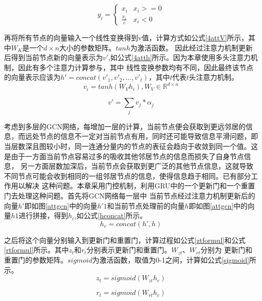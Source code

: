 \begin{equation}\label{4attleakyRelu}
y_i =
\begin{cases}
x_i & \text{$x_i>=0$} \\
\frac{x_i}{c} & \text{$x_i<0$}
\end{cases}
\end{equation}

再将所有节点的向量输入一个线性变换得到v值，计算方式如公式\ref{4attV}所示，其中$W_K$是一个$d\times n$大小的参数矩阵。$tanh$为激活函数。
因此经过注意力机制更新后得到当前节点新的向量表示为$v'$,如公式\ref{4atth}所示。因为本章使用多头注意力机制，因此有多个注意力计算参与，其中
线性变换参数均有不同，因此最终该节点的向量表示应该为$h'= concat(v'_1,v'_2,...,v'_t)$，其中$t$代表$t$头注意力机制。
\begin{equation}\label{4attV}
    v_i = tanh(W_Vh_i), W_V\in \mathbb{R}^{d\times n}
\end{equation}

\begin{equation}\label{4atth}
    v' = \sum_{j}v_j* \alpha_j
\end{equation}

考虑到多层的GCN网络，每增加一层的计算，当前节点便会获取到更远邻居的信息，而远处节点的信息不一定对当前节点有用，同时还可能导致信息平滑问题，即
当层数深且图较小时，同一连通分量内的节点的表征会趋向于收敛到同一个值。这是由于一方面当前节点容易过多的吸收其他邻居节点的信息而损失了自身节点信息，
另一方面层数加深后，当前节点会获取到更广泛的其他节点信息，这就导致不同节点可能会收到相同的一组邻居节点的信息，使得信息趋于相同。已有部分工作用以解决
这种问题。本章采用门控机制，利用GRU中的一个更新门和一个重置门去处理这种问题。首先将GCN网络每一层中
当前节点经过注意力机制更新后的向量$h'$即如图\ref{attgcn}中的向量$h'1$和当前节点处理前的向量$h$即如图\ref{attgcn}中的向量$h1$进行拼接，得到$h_c$,如公式\ref{hconcat}所示。
\begin{equation}\label{hconcat}
    h_c = concat(h',h)
\end{equation}

之后将这个向量分别输入到更新门和重置门，计算过程如公式\ref{ztformul}和公式\ref{rtformul}所示。其中$z_t$和$r_t$分别表示更新门和重置门。$W_{zt}$、$W_{rt}$分别为
更新门和重置门的参数矩阵。$sigmoid$为激活函数，取值为0-1之间，计算如公式\ref{sigmoid}所示。
\begin{equation}\label{ztformul}
    z_t = sigmoid(W_{zt}h_c)
\end{equation}

\begin{equation}\label{rtformul}
    r_t = sigmoid(W_{rt}h_c)
\end{equation}

